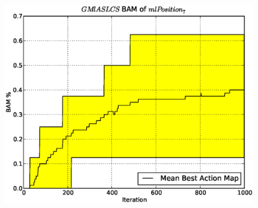 \begin{figure}[ht]
  \centering
  \includegraphics[scale=.49]{./images/artificial/gmlaslcs0/base/mlPosition7GMlASLCSbam.eps}
\end{figure}


